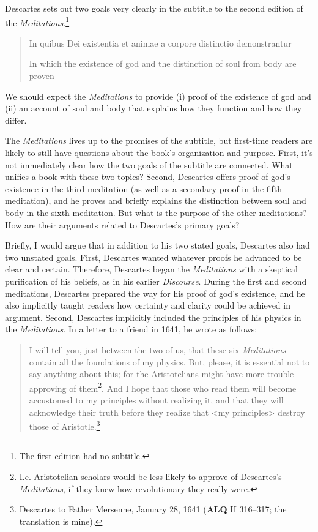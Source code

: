 Descartes sets out two goals very clearly in the subtitle to the second edition of the \textit{Meditations}.\footnote{The first edition had no subtitle.}

\begin{quote}
    In quibus Dei existentia et animae a corpore distinctio demonstrantur

    In which the existence of god and the distinction of soul from body are proven
\end{quote}
We should expect the \textit{Meditations} to provide (i) proof of the existence of god and (ii) an account of soul and body that explains how they function and how they differ.

The \textit{Meditations} lives up to the promises of the subtitle, but first-time readers are likely to still have questions about the book's organization and purpose. First, it's not immediately clear how the two goals of the subtitle are connected. What unifies a book with these two topics? Second, Descartes offers proof of god's existence in the third meditation (as well as a secondary proof in the fifth meditation), and he proves and briefly explains the distinction between soul and body in the sixth meditation. But what is the purpose of the other meditations? How are their arguments related to Descartes's primary goals?

Briefly, I would argue that in addition to his two stated goals, Descartes also had two unstated goals. First, Descartes wanted whatever proofs he advanced to be clear and certain. Therefore, Descartes began the \textit{Meditations} with a skeptical purification of his beliefs, as in his earlier \textit{Discourse}. During the first and second meditations, Descartes prepared the way for his proof of god's existence, and he also implicitly taught readers how certainty and clarity could be achieved in argument. Second, Descartes implicitly included the principles of his physics in the \textit{Meditations}. In a letter to a friend in 1641, he wrote as follows:

\begin{quote}
    I will tell you, just between the two of us, that these six \textit{Meditations} contain all the foundations of my physics. But, please, it is essential not to say anything about this; for the Aristotelians might have more trouble approving of them\footnote{I.e. Aristotelian scholars would be less likely to approve of Descartes's \textit{Meditations}, if they knew how revolutionary they really were.}. And I hope that those who read them will become accustomed to my principles without realizing it, and that they will acknowledge their truth before they realize that <my principles> destroy those of Aristotle.\footnote{Descartes to Father Mersenne, January 28, 1641 (\textbf{ALQ} II 316--317; the translation is mine).}
\end{quote}

